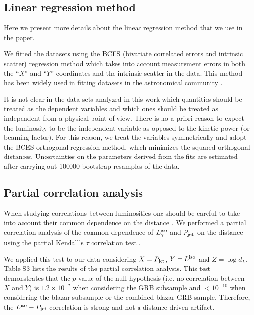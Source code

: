 \documentclass[12pt]{article}
\begin{document}
\subsection*{Linear regression method}

Here we present more details about the linear regression method that we use in the paper. 

We fitted the datasets using the BCES (bivariate correlated errors and intrinsic scatter) regression method \cite{sbces} which takes into account measurement errors in both the ``$X$'' and ``$Y$'' coordinates and the intrinsic scatter in the data. This method has been widely used in fitting datasets in the astronomical community \cite{svester06,spratt09}.

It is not clear in the data sets analyzed in this work which quantities should be treated as the dependent variables and which  ones should be treated as independent from a physical point of view. There is no a priori reason to expect the luminosity to be the independent variable as opposed to the kinetic power (or beaming factor). For this reason, we treat the variables symmetrically and adopt the BCES orthogonal regression method, which minimizes the squared orthogonal distances. Uncertainties on the parameters derived from the fits are estimated after carrying out 100000 bootstrap resamples of the data. 








\subsection*{Partial correlation analysis}

When studying correlations between luminosities one should be careful to take into account their common dependence on the distance \cite{smerloni03}. We performed a partial correlation analysis of the common dependence of $L_\gamma^{\rm iso}$ and $P_{\rm jet}$ on the distance using the partial Kendall's $\tau$ correlation test \cite{spca}. 

We applied this test to our data considering $X=P_{\rm jet}$, $Y=L^{\rm iso}$ and $Z=\log d_L$. Table S3 lists the results of the partial correlation analysis.
This test demonstrates that the $p$-value of the null hypothesis (i.e. no correlation between $X$ and $Y$) is $1.2 \times 10^{-7}$ when considering the GRB subsample and $<10^{-10}$ when considering the blazar subsample or the combined blazar-GRB sample. Therefore, the $L^{\rm iso} - P_{\rm jet}$ correlation is strong and not a distance-driven artifact.
\end{document}
